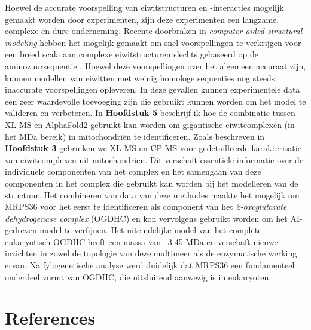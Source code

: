 Hoewel de accurate voorspelling van eiwitstructuren en -interacties mogelijk gemaakt worden door experimenten, zijn deze experimenten een langzame, complexe en dure onderneming. Recente doorbraken in \emph{computer-aided structural modeling} hebben het mogelijk gemaakt om snel voorspellingen te verkrijgen voor een breed scala aan complexe eiwitstructuren slechts gebaseerd op de aminozuursequentie \cite{RN5, RN4}. Hoewel deze voorspellingen over het algemeen accuraat zijn, kunnen modellen van eiwitten met weinig homologe sequenties nog steeds inaccurate voorspellingen opleveren. In deze gevallen kunnen experimentele data een zeer waardevolle toevoeging zijn die gebruikt kunnen worden om het model te valideren en verbeteren. In \textbf{Hoofdstuk 5} beschrijf ik hoe de combinatie tussen XL-MS en AlphaFold2 \cite{RN4} gebruikt kan worden om gigantische eiwitcomplexen (in het MDa bereik) in mitochondriën te identificeren. Zoals beschreven in \textbf{Hoofdstuk 3} gebruiken we XL-MS en CP-MS voor gedetailleerde karakterisatie van eiwitcomplexen uit mitochondriën. Dit verschaft essentiële informatie over de individuele componenten van het complex en het samengaan van deze componenten in het complex die gebruikt kan worden bij het modelleren van de structuur. Het combineren van data van deze methodes maakte het mogelijk om MRPS36 voor het eerst te identificeren als component van het \emph{2-oxoglutarate dehydrogenase complex} (OGDHC) en kon vervolgens gebruikt worden om het AI-gedreven model te verfijnen. Het uiteindelijke model van het complete eukaryotisch OGDHC heeft een massa van ~3.45 MDa en verschaft nieuwe inzichten in zowel de topologie van deze multimeer als de enzymatische werking ervan. Na fylogenetische analyse werd duidelijk dat MRPS36 een fundamenteel onderdeel vormt van OGDHC, die uitsluitend aanwezig is in eukaryoten.
\clearpage
\section*{References}


